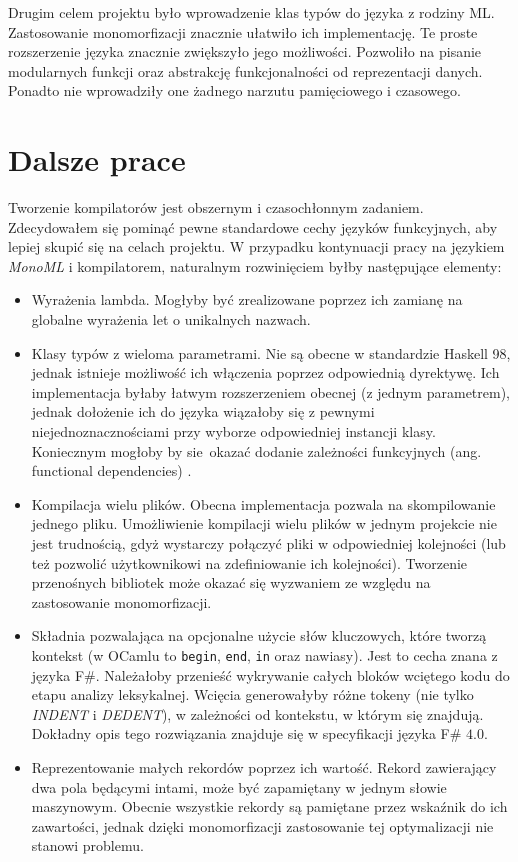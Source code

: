 \documentclass[declaration,shortabstract]{iithesis}
\begin{document}
Drugim celem projektu było wprowadzenie klas typów do języka z rodziny ML. 
Zastosowanie monomorfizacji znacznie ułatwiło ich implementację. Te proste
rozszerzenie języka znacznie zwiększyło jego możliwości. Pozwoliło na 
pisanie modularnych funkcji oraz abstrakcję funkcjonalności od reprezentacji 
danych. Ponadto nie wprowadziły one żadnego narzutu pamięciowego i czasowego.

\section{Dalsze prace}

Tworzenie kompilatorów jest obszernym i czasochłonnym zadaniem. Zdecydowałem 
się pominąć pewne standardowe cechy języków funkcyjnych, aby lepiej skupić 
się na celach projektu. W przypadku kontynuacji pracy na językiem \textit{MonoML}
i kompilatorem, naturalnym rozwinięciem byłby następujące elementy:

\begin{itemize}
  \item Wyrażenia lambda. Mogłyby być zrealizowane poprzez ich zamianę na 
  globalne wyrażenia let o unikalnych nazwach. 
  \item Klasy typów z wieloma parametrami. Nie są obecne w standardzie 
  Haskell 98, jednak istnieje możliwość ich włączenia poprzez odpowiednią 
  dyrektywę. Ich implementacja byłaby łatwym 
  rozszerzeniem obecnej (z jednym parametrem), jednak dołożenie ich do języka 
  wiązałoby się z pewnymi niejednoznacznościami \cite{multi_params_tcs}
  przy wyborze odpowiedniej instancji klasy. Koniecznym mogłoby by sie okazać 
  dodanie zależności funkcyjnych (ang. functional dependencies) \cite{fun_deps}.
  \item Kompilacja wielu plików. Obecna implementacja pozwala na skompilowanie 
  jednego pliku. Umożliwienie kompilacji wielu plików w jednym projekcie nie 
  jest trudnością, gdyż wystarczy połączyć pliki w odpowiedniej kolejności 
  (lub też pozwolić użytkownikowi na zdefiniowanie ich kolejności). Tworzenie 
  przenośnych bibliotek może okazać się wyzwaniem ze względu na zastosowanie 
  monomorfizacji.
  \item Składnia pozwalająca na opcjonalne użycie słów kluczowych, które tworzą 
  kontekst (w OCamlu to \texttt{begin}, \texttt{end}, \texttt{in} oraz nawiasy).
  Jest to cecha znana z języka F\#. Należałoby przenieść wykrywanie 
  całych bloków wciętego kodu do etapu analizy leksykalnej. Wcięcia generowałyby 
  różne tokeny (nie tylko \textit{INDENT} i \textit{DEDENT}), w zależności 
  od kontekstu, w którym się znajdują. Dokładny opis tego rozwiązania znajduje 
  się w specyfikacji języka F\# $4.0$\cite{fs_spec}.
  \item Reprezentowanie małych rekordów poprzez ich wartość. Rekord zawierający 
  dwa pola będącymi intami, może być zapamiętany w jednym słowie maszynowym. 
  Obecnie wszystkie rekordy są pamiętane przez wskaźnik do ich zawartości, 
  jednak dzięki monomorfizacji zastosowanie tej optymalizacji nie stanowi 
  problemu.

\end{itemize}
\end{document}
